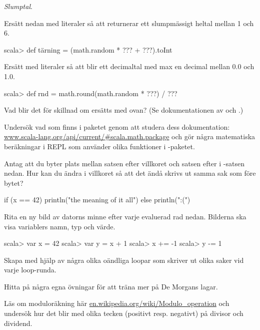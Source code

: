 {{\clearpage

\ExtraTasks

\Task \textit{Slumptal}.

\Subtask Ersätt  nedan med literaler så att  returnerar ett slumpmässigt heltal mellan 1 och 6.
\begin{REPLnonum}
scala> def tärning = (math.random * ??? + ???).toInt
\end{REPLnonum}

\Subtask Ersätt  med literaler så att  blir ett decimaltal med max en decimal mellan 0.0 och 1.0.
\begin{REPLnonum}
scala> def rnd = math.round(math.random * ???) / ???
\end{REPLnonum}

\Subtask Vad blir det för skillnad om  ersätts med  ovan? (Se dokumentationen av  och .)

\Task Undersök vad som finns i paketet  genom att studera dess dokumentation: \href{http://www.scala-lang.org/api/current/#scala.math.package}{www.scala-lang.org/api/current/\#scala.math.package} och gör några matematiska beräkningar i REPL som använder olika funktioner i -paketet.

\Task\Pen Antag att du byter plats mellan satsen efter villkoret och satsen efter  i -satsen nedan. Hur kan du ändra i villkoret så att det ändå skrivs ut samma sak som före bytet?
\begin{Code}
if (x == 42) println("the meaning of it all") else println(":(")
\end{Code}

\Task\Pen Rita en ny bild av datorns minne efter varje evaluerad rad nedan. Bilderna ska visa variablers namn, typ och värde.
\begin{REPL}
scala> var x = 42
scala> var y = x + 1
scala> x += -1
scala> y -= 1
\end{REPL}

\Task Skapa med hjälp av  några olika oändliga loopar som skriver ut olika saker vid varje loop-runda.

\Task Hitta på några egna övningar för att träna mer på De Morgans lagar.



\clearpage

\AdvancedTasks

\Task Läs om moduloräkning här \href{https://en.wikipedia.org/wiki/Modulo\_operation}{en.wikipedia.org/wiki/Modulo\_operation} och undersök hur det blir med olika tecken (positivt resp. negativt) på divisor och dividend.



}}
